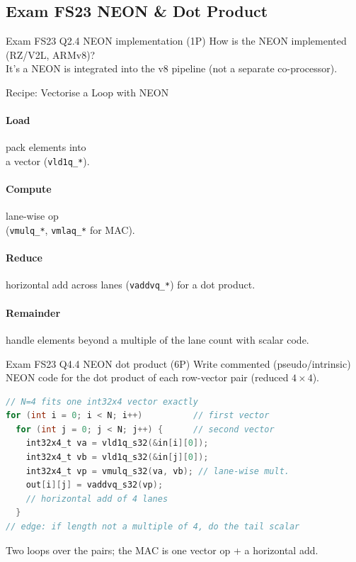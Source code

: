 \multend

\subsection{Exam FS23 NEON \& Dot Product}

\begin{example2}{Exam FS23 Q2.4 NEON implementation (1P)}
    How is the NEON implemented (RZ/V2L, ARMv8)?
     \\ 
    It's a  NEON is integrated into the v8 pipeline (not a separate co-processor).
\end{example2}

    \begin{minipage}{0.3\linewidth}

\begin{KR}{Recipe: Vectorise a Loop with NEON}
    \paragraph{Load} pack elements into \\ a vector (\texttt{vld1q\_*}).
    \paragraph{Compute} lane-wise op \\ (\texttt{vmulq\_*}, \texttt{vmlaq\_*} for MAC).
    \paragraph{Reduce} horizontal add across lanes (\texttt{vaddvq\_*}) for a dot product.
    \paragraph{Remainder} handle elements beyond a multiple of the lane count with scalar code.
\end{KR}

    \end{minipage}
    \begin{minipage}{0.69\linewidth}

\begin{example2}{Exam FS23 Q4.4 NEON dot product (6P)}
    Write commented (pseudo/intrinsic) NEON code for the dot product of each row-vector pair (reduced $4\times4$).
     \\ 
\begin{lstlisting}[language=C, style=basesmol]
// N=4 fits one int32x4 vector exactly
for (int i = 0; i < N; i++)          // first vector
  for (int j = 0; j < N; j++) {      // second vector
    int32x4_t va = vld1q_s32(&in[i][0]);
    int32x4_t vb = vld1q_s32(&in[j][0]);
    int32x4_t vp = vmulq_s32(va, vb); // lane-wise mult.
    out[i][j] = vaddvq_s32(vp); 
    // horizontal add of 4 lanes
  }
// edge: if length not a multiple of 4, do the tail scalar
\end{lstlisting}
    Two loops over the pairs; the MAC is one vector op + a horizontal add.
\end{example2}

\end{minipage}

